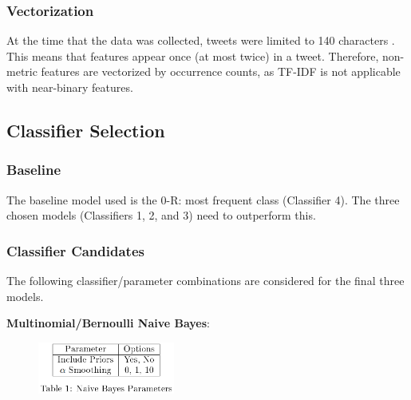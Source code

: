 \documentclass[11pt]{article}
\begin{document}
\subsubsection{Vectorization}\label{sec:vectorization}

At the time that the data was collected, tweets were limited to 140 characters \cite{tweetlen}.
This means that features appear once (at most twice) in a tweet.
Therefore, non-metric features are vectorized by occurrence counts, 
as TF-IDF is not applicable with near-binary features. 

\subsection{Classifier Selection}

\subsubsection{Baseline}

The baseline model used is the 0-R: most frequent class (Classifier 4).
The three chosen models (Classifiers 1, 2, and 3) need to outperform this.

\subsubsection{Classifier Candidates}\label{sec:allcandidates}

The following classifier/parameter combinations are considered for the final three models. 

\textbf{Multinomial/Bernoulli Naive Bayes}:

\begin{figure}[H]
	\centering
	\includegraphics[width = 0.4\textwidth]{tb nb.png}
	\label{tbl:nb-options}
\end{figure} 
\end{document}
